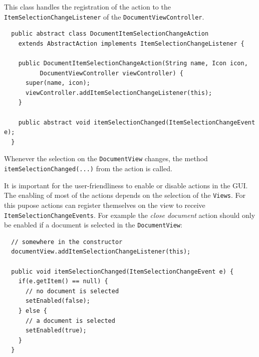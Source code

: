This class handles the registration of the action to the \texttt{Item\-Selection\-Change\-Listener} of  the \texttt{Document\-View\-Controller}.

\begin{verbatim}
  public abstract class DocumentItemSelectionChangeAction
    extends AbstractAction implements ItemSelectionChangeListener {
  
    public DocumentItemSelectionChangeAction(String name, Icon icon,
          DocumentViewController viewController) {
      super(name, icon);
      viewController.addItemSelectionChangeListener(this);
    }
    
    public abstract void itemSelectionChanged(ItemSelectionChangeEvent e);
  }
\end{verbatim}

Whenever the selection on the \texttt{Document\-View} changes, the method \texttt{itemSelectionChanged(...)} from the action is called.

It is important for the user-friendliness to enable or disable actions in the GUI. The enabling of most of the actions depends on the selection of the \texttt{Views}. For this pupose actions can register themselves on the view to receive \texttt{Item\-Selection\-Change\-Events}.  For example the \emph{close document} action should only be enabled if a document is selected in the \texttt{Document\-View}:

\begin{verbatim}
  // somewhere in the constructor
  documentView.addItemSelectionChangeListener(this);

  public void itemSelectionChanged(ItemSelectionChangeEvent e) {
    if(e.getItem() == null) {
      // no document is selected
      setEnabled(false);
    } else {
      // a document is selected
      setEnabled(true);
    }
  }
\end{verbatim}


